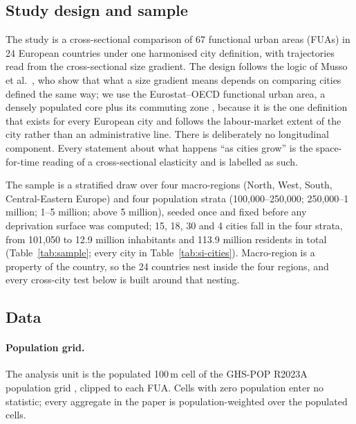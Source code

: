 \documentclass[11pt]{article}
\begin{document}
\subsection{Study design and sample}\label{sec:m-design}

The study is a cross-sectional comparison of 67 functional urban areas
(FUAs) in 24 European countries under one harmonised city definition, with
trajectories read from the cross-sectional size gradient. The design
follows the logic of Musso et al.\ \citep{musso2026cities}, who show that
what a size gradient means depends on comparing cities defined the same
way; we use the Eurostat--OECD functional urban area, a densely populated
core plus its commuting zone \citep{dijkstra2019fua}, because it is the
one definition that exists for every European city and follows the
labour-market extent of the city rather than an administrative line. There
is deliberately no longitudinal component. Every statement about what
happens ``as cities grow'' is the space-for-time reading of a
cross-sectional elasticity and is labelled as such.

The sample is a stratified draw over four macro-regions (North, West,
South, Central-Eastern Europe) and four population strata
(100{,}000--250{,}000; 250{,}000--1 million; 1--5 million; above 5
million), seeded once and fixed before any deprivation surface was
computed; 15, 18, 30 and 4 cities fall in the four strata, from
101{,}050 to 12.9 million inhabitants and 113.9 million residents in
total (Table~\ref{tab:sample}; every city in Table~\ref{tab:si-cities}).
Macro-region is a property of the country, so the 24 countries nest
inside the four regions, and every cross-city test below is built around
that nesting.

\subsection{Data}\label{sec:m-data}

\paragraph{Population grid.} The analysis unit is the populated 100\,m cell
of the GHS-POP R2023A population grid \citep{schiavina2023ghspop}, clipped
to each FUA. Cells with zero population enter no statistic; every
aggregate in the paper is population-weighted over the populated cells.
\end{document}
